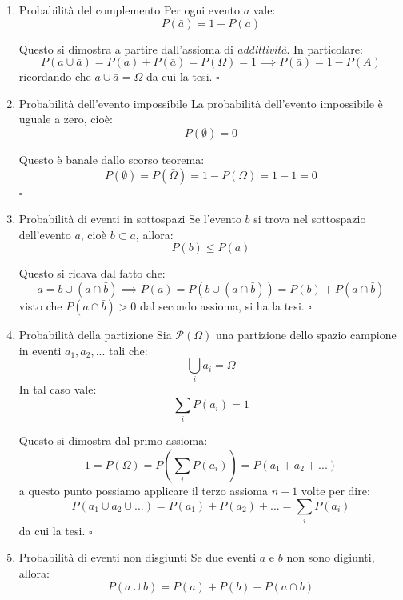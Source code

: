 \documentclass[a4paper,11pt]{article}
\begin{document}
\begin{enumerate}
	\item \begin{theorem}{Probabilità del complemento}
		Per ogni evento $a$ vale:
		$$
			P(\bar{a}) = 1 - P(a)
		$$

	\end{theorem} 
		Questo si dimostra a partire dall'assioma di \textit{addittività}. In particolare:
		$$
		P(a \cup \bar{a}) = P(a) + P(\bar{a}) = P(\Omega) = 1 \implies P(\bar{a}) = 1 - P(A)
		$$
		ricordando che $a \cup \bar{a} = \Omega$ da cui la tesi. \hfill $\square$

	\item \begin{theorem}{Probabilità dell'evento impossibile}
		La probabilità dell'evento impossibile è uguale a zero, cioè:
		$$
			P(\emptyset) = 0
		$$
	\end{theorem}
		Questo è banale dallo scorso teorema:
		$$
			P(\emptyset) = P(\bar{\Omega}) = 1 - P(\Omega) = 1 - 1 = 0
		$$
		\hfill $\square$

	\item \begin{theorem}{Probabilità di eventi in sottospazi}
		Se l'evento $b$ si trova nel sottospazio dell'evento $a$, cioè $b \subset a$, allora:
		$$
			P(b) \leq P(a)
		$$
	\end{theorem}

		Questo si ricava dal fatto che:
		$$
		a = b \cup (a \cap \bar{b}) \implies P(a) = P\left( b \cup (a \cap \bar{b}) \right) = P(b) + P(a \cap \bar{b})
		$$
		visto che $P(a \cap \bar{b}) > 0$ dal secondo assioma, si ha la tesi. \hfill $\square$

	\item \begin{theorem}{Probabilità della partizione}
		Sia $\mathcal{P}(\Omega)$ una partizione dello spazio campione in eventi $a_1, a_2, ...$ tali che:
		$$
			\bigcup_i a_i = \Omega
		$$
		In tal caso vale:
		$$
		 	\sum_i P(a_i) = 1	
		$$
	\end{theorem}

	Questo si dimostra dal primo assioma:
	$$
		1 = P(\Omega) = P\left(\sum_i P(a_i)\right) = P(a_1 + a_2 + ...)
	$$
	a questo punto possiamo applicare il terzo assioma $n - 1$ volte per dire:
	$$
		P(a_1 \cup a_2 \cup ...) = P(a_1) + P(a_2) + ... = \sum_i P(a_i)
	$$
	da cui la tesi. \hfill $\square$

	\item \begin{theorem}{Probabilità di eventi non disgiunti}
		Se due eventi $a$ e $b$ non sono digiunti, allora:
		$$
			P(a \cup b) = P(a) + P(b) - P(a \cap b)
		$$
	\end{theorem}


\end{enumerate}
\end{document}

